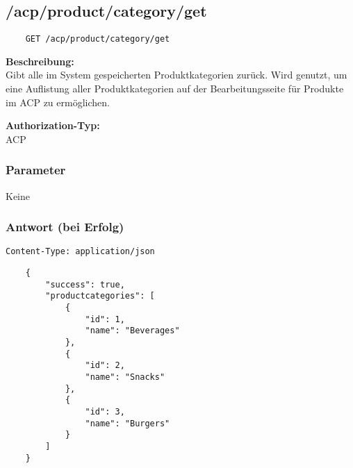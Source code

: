 \subsection{/acp/product/category/get}

\begin{lstlisting}
    GET /acp/product/category/get
\end{lstlisting}

\textbf{Beschreibung:} \\
Gibt alle im System gespeicherten Produktkategorien zurück. Wird genutzt, um eine Auflistung aller Produktkategorien auf der Bearbeitungsseite für Produkte im ACP zu ermöglichen.

\textbf{Authorization-Typ:} \\
ACP

\subsubsection{Parameter}
Keine

\subsubsection{Antwort (bei Erfolg)}

\lstinline{Content-Type: application/json}
\begin{lstlisting}
    {
        "success": true, 
        "productcategories": [
            {
                "id": 1,
                "name": "Beverages"
            },
            {
                "id": 2,
                "name": "Snacks"
            },
            {
                "id": 3,
                "name": "Burgers"
            }
        ]
    }
\end{lstlisting}
